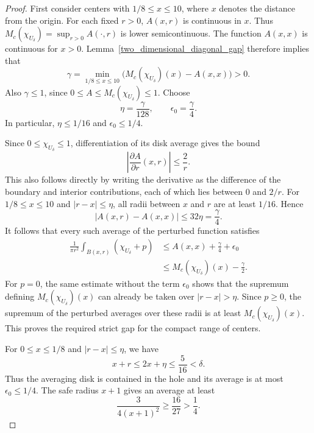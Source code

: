 \documentclass[12pt]{amsart}
\numberwithin{equation}{section}
\begin{document}
\begin{proof}
First consider centers with $1/8\leq x\leq10$, where $x$ denotes the
distance from the origin. For each fixed $r>0$, $A(x,r)$ is continuous
in $x$. Thus $M_c(\chi_{U_\delta})=\sup_{r>0}A(\cdot,r)$ is lower
semicontinuous. The function $A(x,x)$ is continuous for $x>0$.
Lemma~\ref{two_dimensional_diagonal_gap} therefore implies that
\begin{equation}
\label{two_dimensional_gamma}
\gamma=\min_{1/8\leq x\leq10}
\bigl(M_c(\chi_{U_\delta})(x)-A(x,x)\bigr)>0.
\end{equation}
Also $\gamma\leq1$, since $0\leq A\leq M_c(\chi_{U_\delta})\leq1$.
Choose
\begin{equation}
\label{two_dimensional_constants}
\eta=\frac{\gamma}{128},\qquad
\epsilon_0=\frac{\gamma}{4}.
\end{equation}
In particular, $\eta\leq1/16$ and $\epsilon_0\leq1/4$.

Since $0\leq\chi_{U_\delta}\leq1$, differentiation of its disk average
gives the bound
\[
\left|\frac{\partial A}{\partial r}(x,r)\right|\leq\frac2r.
\]
This also follows directly by writing the derivative as the difference
of the boundary and interior contributions, each of which lies between
$0$ and $2/r$. For $1/8\leq x\leq10$ and $|r-x|\leq\eta$, all radii
between $x$ and $r$ are at least $1/16$. Hence
\[
|A(x,r)-A(x,x)|\leq32\eta=\frac{\gamma}{4}.
\]
It follows that every such average of the perturbed function satisfies
\begin{align*}
\frac1{\pi r^2}\int_{B(x,r)}(\chi_{U_\delta}+p)
&\leq A(x,x)+\frac{\gamma}{4}+\epsilon_0\\
&\leq M_c(\chi_{U_\delta})(x)-\frac{\gamma}{2}.
\end{align*}
For $p=0$, the same estimate without the term $\epsilon_0$ shows that
the supremum defining $M_c(\chi_{U_\delta})(x)$ can already be taken
over $|r-x|>\eta$. Since $p\geq0$, the supremum of the perturbed
averages over these radii is at least $M_c(\chi_{U_\delta})(x)$.
This proves the required strict gap for the compact range of centers.

For $0\leq x\leq1/8$ and $|r-x|\leq\eta$, we have
\[
x+r\leq2x+\eta\leq\frac5{16}<\delta.
\]
Thus the averaging disk is contained in the hole and its average is
at most $\epsilon_0\leq1/4$. The safe radius $x+1$ gives an average
at least
\[
\frac{3}{4(x+1)^2}\geq\frac{16}{27}>\frac14.
\]


\end{proof}
\end{document}
